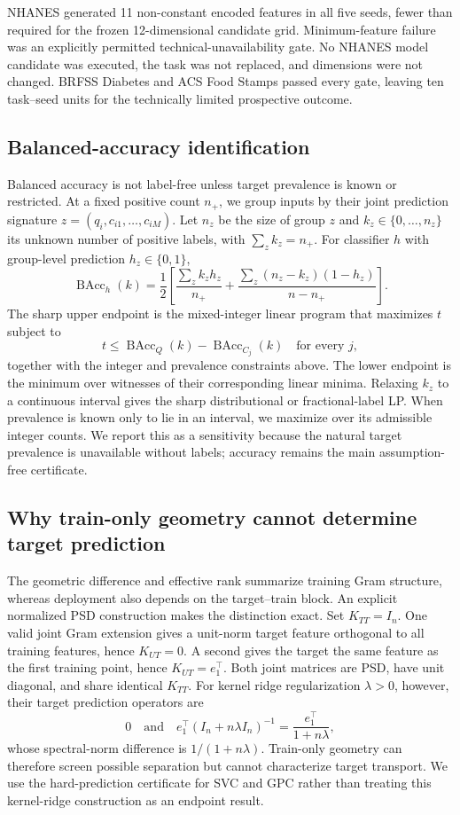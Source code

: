 \documentclass[referee,lineno,pdflatex,sn-vancouver-num]{sn-jnl}
\theoremstyle{thmstyleone}%
\theoremstyle{thmstyletwo}%
\theoremstyle{thmstylethree}%
\begin{document}
NHANES generated 11 non-constant encoded features in all five seeds, fewer than required for the frozen 12-dimensional candidate grid. Minimum-feature failure was an explicitly permitted technical-unavailability gate. No NHANES model candidate was executed, the task was not replaced, and dimensions were not changed. BRFSS Diabetes and ACS Food Stamps passed every gate, leaving ten task--seed units for the technically limited prospective outcome.

\subsection{Balanced-accuracy identification}
\label{sec:methods_bacc}

Balanced accuracy is not label-free unless target prevalence is known or restricted. At a fixed positive count $n_+$, we group inputs by their joint prediction signature $z=(q_i,c_{i1},\ldots,c_{iM})$. Let $n_z$ be the size of group $z$ and $k_z\in\{0,\ldots,n_z\}$ its unknown number of positive labels, with $\sum_zk_z=n_+$. For classifier $h$ with group-level prediction $h_z\in\{0,1\}$,
\[
\operatorname{BAcc}_h(k)=\frac12\left[
\frac{\sum_z k_z h_z}{n_+}+
\frac{\sum_z(n_z-k_z)(1-h_z)}{n-n_+}
\right].
\]
The sharp upper endpoint is the mixed-integer linear program that maximizes $t$ subject to
\[
t\leq\operatorname{BAcc}_Q(k)-\operatorname{BAcc}_{C_j}(k)
\quad\text{for every }j,
\]
together with the integer and prevalence constraints above. The lower endpoint is the minimum over witnesses of their corresponding linear minima. Relaxing $k_z$ to a continuous interval gives the sharp distributional or fractional-label LP. When prevalence is known only to lie in an interval, we maximize over its admissible integer counts. We report this as a sensitivity because the natural target prevalence is unavailable without labels; accuracy remains the main assumption-free certificate.

\subsection{Why train-only geometry cannot determine target prediction}
\label{sec:methods_transport}

The geometric difference and effective rank summarize training Gram structure, whereas deployment also depends on the target--train block. An explicit normalized PSD construction makes the distinction exact. Set $K_{TT}=I_n$. One valid joint Gram extension gives a unit-norm target feature orthogonal to all training features, hence $K_{UT}=0$. A second gives the target the same feature as the first training point, hence $K_{UT}=e_1^\top$. Both joint matrices are PSD, have unit diagonal, and share identical $K_{TT}$. For kernel ridge regularization $\lambda>0$, however, their target prediction operators are
\[
0
\quad\text{and}\quad
e_1^\top(I_n+n\lambda I_n)^{-1}
=\frac{e_1^\top}{1+n\lambda},
\]
whose spectral-norm difference is $1/(1+n\lambda)$. Train-only geometry can therefore screen possible separation but cannot characterize target transport. We use the hard-prediction certificate for SVC and GPC rather than treating this kernel-ridge construction as an endpoint result.
\end{document}
